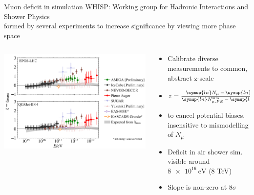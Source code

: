 \documentclass[aspectratio=1610, 9pt]{beamer}
\begin{document}
\begin{frame}{Muon deficit in simulation}
  WHISP: Working group for Hadronic Interactions and Shower Physics \\
  formed by several experiments to increase significance by viewing more phase space \\
  \begin{columns}
    \begin{column}[c]{0.48\textwidth}
      \includegraphics[width=\textwidth]{z_zmass.png}
    \end{column}
    \begin{column}[c]{0.48\textwidth}
      \begin{itemize}
        \item Calibrate diverse measurements to common, abstract z-scale
        \item $z = \frac{\symup{ln}N_\mu \,-\, \symup{ln}N_{\mu,p}^\text{sim}}
        {\symup{ln}N_{\mu,FE}^\text{sim} \,-\, \symup{ln}N_{\mu,p}^\text{sim}}$
        \item to cancel potential biases, insensitive to mismodelling of $N_{\mu}$
        \item Deficit in air shower sim. visible around $\SI{8e16}{\electronvolt}$ (8 TeV)
        \item Slope is non-zero at 8$\sigma$
      \end{itemize}
    \end{column}
  \end{columns}
\end{frame}
\end{document}
